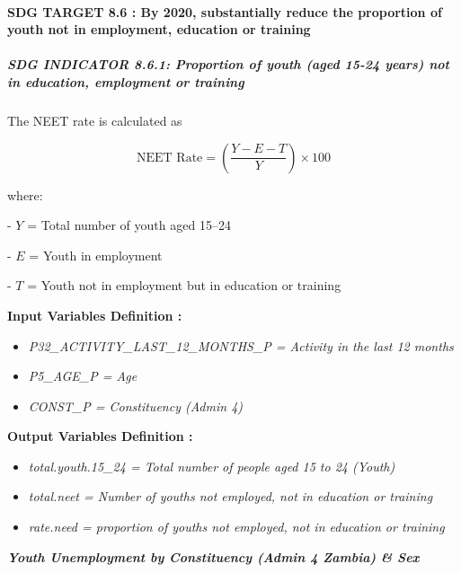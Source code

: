 \documentclass[
]{article}
\begin{document}
\paragraph{SDG TARGET 8.6 : By 2020, substantially reduce the proportion
of youth not in employment, education or
training}\label{sdg-target-8.6-by-2020-substantially-reduce-the-proportion-of-youth-not-in-employment-education-or-training}

\subparagraph{\texorpdfstring{\textbf{SDG INDICATOR 8.6.1: Proportion of
youth (aged 15-24 years) not in education, employment or
training}}{SDG INDICATOR 8.6.1: Proportion of youth (aged 15-24 years) not in education, employment or training}}\label{sdg-indicator-8.6.1-proportion-of-youth-aged-15-24-years-not-in-education-employment-or-training}

The NEET rate is calculated as

\[
\text{NEET Rate} = \left( \frac{Y - E - T}{Y} \right) \times 100
\]

where:

- \(Y\) = Total number of youth aged 15--24

- \(E\) = Youth in employment

- \(T\) = Youth not in employment but in education or training

\textbf{Input Variables Definition :}

\begin{itemize}
\item
  \emph{P32\_ACTIVITY\_LAST\_12\_MONTHS\_P = Activity in the last 12
  months}
\item
  \emph{P5\_AGE\_P = Age}
\item
  \emph{CONST\_P = Constituency (Admin 4)}
\end{itemize}

\textbf{Output Variables Definition :}

\begin{itemize}
\item
  \emph{total.youth.15\_24 = Total number of people aged 15 to 24
  (Youth)}
\item
  \emph{total.neet = Number of youths not employed, not in education or
  training}
\item
  \emph{rate.need = proportion of youths not employed, not in education
  or training}
\end{itemize}

\textbf{\emph{Youth Unemployment by Constituency (Admin 4 Zambia) \&
Sex}}
\end{document}
